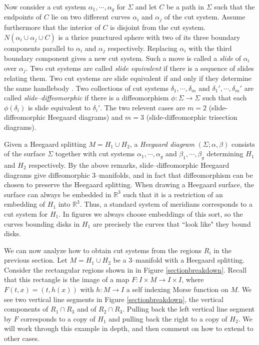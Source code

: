 \documentclass[12pt]{amsart}
\newcommand{\R}{\mathbb{R}}
\theoremstyle{definition}
\theoremstyle{remark}
\begin{document}
Now consider a cut system $\alpha_1,\cdots,\alpha_g$ for $\Sigma$ and let $C$ be a path in $\Sigma$ such that the endpoints of $C$ lie on two different curves $\alpha_i$ and $\alpha_j$ of the cut system.
Assume furthermore that the interior of $C$ is disjoint from the cut system.
$N(\alpha_i \cup \alpha_j \cup C)$ is a thrice punctured sphere with two of its three boundary components parallel to $\alpha_i$ and $\alpha_j$ respectively.
Replacing $\alpha_i$ with the third boundary component gives a new cut system.
Such a move is called a \emph{slide} of $\alpha_i$ over $\alpha_j$.
Two cut systems are called \emph{slide equivalent} if there is a sequence of slides relating them.
Two cut systems are slide equivalent if and only if they determine the same handlebody \cite{Johannson1}.
Two collections of cut systems $\delta_1,\cdots,\delta_m$ and $\delta_1',\cdots,\delta_m'$ are called \emph{slide--diffeomorphic} if there is a diffeomorphism $\phi\colon \Sigma \to \Sigma$ such that each $\phi(\delta_i)$ is slide equivalent to $\delta_i '$.
The two relevent cases are $m=2$ (slide-diffeomorphic Heegaard diagrams) and $m=3$ (slide-diffeomorphic trisection diagrams).

Given a Heegaard splitting $M = H_1 \cup H_2$, a \emph{Heegaard diagram} $(\Sigma; \alpha, \beta)$ consists of the surface $\Sigma$ together with cut systems $\alpha_1,\cdots,\alpha_g$ and $\beta_1,\cdots,\beta_g$ determining $H_1$ and $H_2$ respectively.
By the above remarks, slide--diffeomorphic Heegaard diagrams give diffeomorphic 3--manifolds, and in fact that diffeomorphism can be chosen to preserve the Heegaard splitting.
When drawing a Heegaard surface, the surface can always be embedded in $\R^3$ such that it is a restriction of an embedding of $H_1$ into $\R^3$.
Thus, a standard system of meridians corresponds to a cut system for $H_1$.
In figures we always choose embeddings of this sort, so the curves bounding disks in $H_1$ are precisely the curves that ``look like" they bound disks.

We can now analyze how to obtain cut systems from the regions $R_i$ in the previous section.
Let $M = H_1 \cup H_2$ be a 3--manifold with a Heegaard splitting.
Consider the rectangular regions shown in in Figure \ref{sectionbreakdown}.
Recall that this rectangle is the image of a map $F\colon I \times M \to I \times I$, where $F(t,x) = (t,h(x))$ with $h\colon M \to I$ a self indexing Morse function on $M$.
We see two vertical line segments in Figure \ref{sectionbreakdown}, the vertical components of $R_1 \cap R_3$ and of $R_2 \cap R_3$.
Pulling back the left vertical line segment by $F$ corresponds to a copy of $H_1$ and pulling back the right to a copy of $H_2$.
We will work through this example in depth, and then comment on how to extend to other cases.
\end{document}
